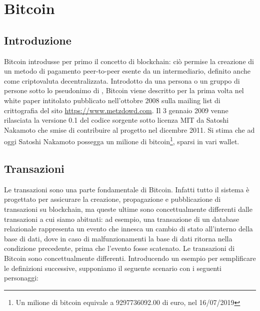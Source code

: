 \chapter{Bitcoin}
\label{chap:bitcoin}

\section{Introduzione}
\label{sec:introduzione}

Bitcoin introdusse per primo il concetto di blockchain: ciò permise la creazione di un metodo di pagamento peer-to-peer esente da un intermediario, definito anche come criptovaluta decentralizzata.
Introdotto da una persona o un gruppo di persone sotto lo pseudonimo di , Bitcoin viene descritto per la prima volta nel white paper intitolato  pubblicato nell’ottobre 2008 sulla mailing list di crittografia del sito \url{https://www.metzdowd.com}.\newline
Il 3 gennaio 2009 venne rilasciata la versione 0.1 del codice sorgente sotto licenza MIT da Satoshi Nakamoto che smise di contribuire al progetto nel dicembre 2011. Si stima che ad oggi Satoshi Nakamoto possegga un milione di bitcoin\footnote{Un milione di bitcoin equivale a 9297736092.00 di euro, nel 16/07/2019}, sparsi in vari wallet.

\section{Transazioni}
\label{sec:transazioniBitcoin}

Le transazioni sono una parte fondamentale di Bitcoin. Infatti tutto il sistema è progettato per assicurare la creazione, propagazione e pubblicazione di transazioni su blockchain, ma queste ultime sono concettualmente differenti dalle transazioni a cui siamo abituati: ad esempio, una transazione di un database relazionale rappresenta un evento che innesca un cambio di stato all’interno della base di dati, dove in caso di malfunzionamenti la base di dati ritorna nella condizione precedente, prima che l’evento fosse scatenato.
Le transazioni di Bitcoin sono concettualmente differenti.\newline
Introducendo un esempio per semplificare le definizioni successive, supponiamo il seguente scenario con i seguenti personaggi:

